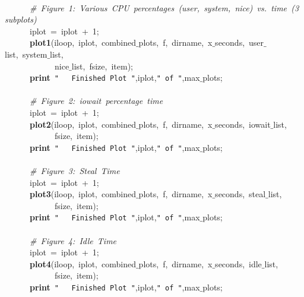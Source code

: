 \mbox{}\ \ \ \ \ \  \\
\mbox{}\ \ \ \ \ \ \textit{\#\ Figure\ 1:\ Various\ CPU\ percentages\ (user,\ system,\ nice)\ vs.\ time\ (3\ subplots)} \\
\mbox{}\ \ \ \ \ \ iplot\ =\ iplot\ +\ 1; \\
\mbox{}\ \ \ \ \ \ \textbf{plot1}(iloop,\ iplot,\ combined$\_$plots,\ f,\ dirname,\ x$\_$seconds,\ user$\_$list,\ system$\_$list,\  \\
\mbox{}\ \ \ \ \ \ \ \ \ \ \ \ nice$\_$list,\ fsize,\ item); \\
\mbox{}\ \ \ \ \ \ \textbf{print}\ \texttt{"{}\ \ \ Finished\ Plot\ "{}},iplot,\texttt{"{}\ of\ "{}},max$\_$plots; \\
\mbox{}\ \ \ \ \ \  \\
\mbox{}\ \ \ \ \ \ \textit{\#\ Figure\ 2:\ iowait\ percentage\ time} \\
\mbox{}\ \ \ \ \ \ iplot\ =\ iplot\ +\ 1; \\
\mbox{}\ \ \ \ \ \ \textbf{plot2}(iloop,\ iplot,\ combined$\_$plots,\ f,\ dirname,\ x$\_$seconds,\ iowait$\_$list,\  \\
\mbox{}\ \ \ \ \ \ \ \ \ \ \ \ fsize,\ item); \\
\mbox{}\ \ \ \ \ \ \textbf{print}\ \texttt{"{}\ \ \ Finished\ Plot\ "{}},iplot,\texttt{"{}\ of\ "{}},max$\_$plots; \\
\mbox{}\ \ \ \ \ \  \\
\mbox{}\ \ \ \ \ \ \textit{\#\ Figure\ 3:\ Steal\ Time} \\
\mbox{}\ \ \ \ \ \ iplot\ =\ iplot\ +\ 1; \\
\mbox{}\ \ \ \ \ \ \textbf{plot3}(iloop,\ iplot,\ combined$\_$plots,\ f,\ dirname,\ x$\_$seconds,\ steal$\_$list,\  \\
\mbox{}\ \ \ \ \ \ \ \ \ \ \ \ fsize,\ item); \\
\mbox{}\ \ \ \ \ \ \textbf{print}\ \texttt{"{}\ \ \ Finished\ Plot\ "{}},iplot,\texttt{"{}\ of\ "{}},max$\_$plots; \\
\mbox{}\ \ \ \ \ \ \ \ \  \\
\mbox{}\ \ \ \ \ \ \textit{\#\ Figure\ 4:\ Idle\ Time} \\
\mbox{}\ \ \ \ \ \ iplot\ =\ iplot\ +\ 1; \\
\mbox{}\ \ \ \ \ \ \textbf{plot4}(iloop,\ iplot,\ combined$\_$plots,\ f,\ dirname,\ x$\_$seconds,\ idle$\_$list, \\
\mbox{}\ \ \ \ \ \ \ \ \ \ \ \ fsize,\ item); \\
\mbox{}\ \ \ \ \ \ \textbf{print}\ \texttt{"{}\ \ \ Finished\ Plot\ "{}},iplot,\texttt{"{}\ of\ "{}},max$\_$plots; \\

